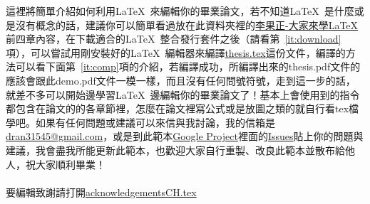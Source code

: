 
 這裡將簡單介紹如何利用\LaTeX\ 來編輯你的畢業論文，若不知道\LaTeX\ 是什麼或是沒有概念的話，建議你可以簡單看過放在此資料夾裡的\href{run:./latex123.pdf}{李果正-大家來學\LaTeX}前四章內容，在下載適合的\LaTeX\ 整合發行套件之後（請看第~\ref{it:download}項），可以嘗試用剛安裝好的\LaTeX\ 編輯器來編譯\href{run:./thesis.tex}{thesis.tex}這份文件，編譯的方法可以看下面第~\ref{it:comp}項的介紹，若編譯成功，所編譯出來的thesis.pdf文件的應該會跟此demo.pdf文件一模一樣，而且沒有任何問號符號，走到這一步的話，就差不多可以開始邊學習\LaTeX\ 邊編輯你的畢業論文了！基本上會使用到的指令都包含在論文的的各章節裡，怎麼在論文裡寫公式或是放圖之類的就自行看tex檔學吧。如果有任何問題或建議可以來信與我討論，我的信箱是\href{mailto:dran31545@gmail.com}{dran31545@gmail.com}，或是到此範本\href{http://code.google.com/p/ntu-thesis-latex-template/}{Google Project}裡面的\href{http://code.google.com/p/ntu-thesis-latex-template/issues/list}{Issues}貼上你的問題與建議，我會盡我所能更新此範本，也歡迎大家自行重製、改良此範本並散布給他人，祝大家順利畢業！\\\\
 要編輯致謝請打開\href{run:./acknowledgementsCH.tex}{acknowledgementsCH.tex}\\
